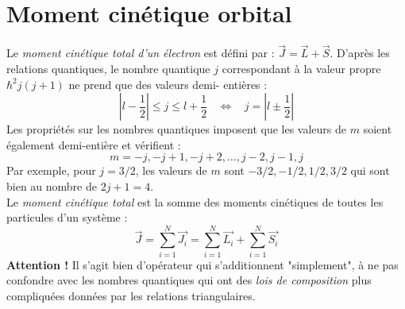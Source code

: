 \documentclass	[11pt, a4paper, openany]{book}
\begin{document}
	
	\section{Moment cinétique orbital}
	Le \textit{moment cinétique total d'un électron} est défini par : $\vec{J} = 
	\vec{L}+\vec{S}$. D'après les relations quantiques, le nombre quantique $j$ 
	correspondant à la valeur propre $\hbar^2j(j+1)$ ne prend que des valeurs demi-
	entières :
	\begin{equation}
	\left|l-\frac{1}{2}\right| \leq j \leq l+\frac{1}{2}\ \ \ \ \Leftrightarrow\ \ \ \
	j = \left|l\pm\frac{1}{2}\right|
	\end{equation}
	Les propriétés sur les nombres quantiques imposent que les valeurs de $m$ soient
	également demi-entière et vérifient :
	\begin{equation}
	m = -j, -j+1, -j+2, \dots, j-2,j-1,j
	\end{equation}
	Par exemple, pour $j=3/2$, les valeurs de $m$ sont $-3/2,-1/2,1/2,3/2$ qui sont 
	bien au nombre de $2j+1=4$.\\
	
	Le \textit{moment cinétique total} est la somme des moments cinétiques de toutes 
	les particules d'un système :
	\begin{equation}
	\vec{J} = \sum_{i=1}^N\vec{J_i} = \sum_{i=1}^N \vec{L_i} + \sum_{i=1}^N \vec{S_i}
	\end{equation}
	\textbf{Attention !} Il s'agit bien d'opérateur qui s'additionnent "simplement", à 
	ne pas confondre avec les nombres quantiques qui ont des \textit{lois de composition} 
	plus compliquées données par les relations triangulaires.
	
	
\end{document}
